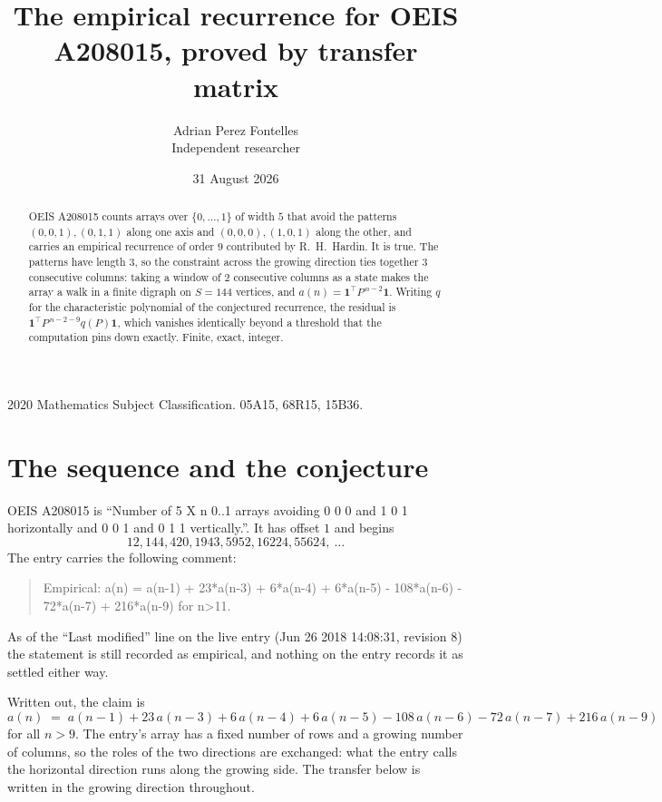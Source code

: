 \documentclass[11pt,a4paper]{article}
\title{The empirical recurrence for OEIS A208015, proved by transfer matrix}
\author{Adrian Perez Fontelles\\ \small Independent researcher}
\date{31 August 2026}
\theoremstyle{plain}
\theoremstyle{definition}
\begin{document}
\maketitle

\begin{abstract}
OEIS A208015 counts arrays over $\{0,\dots,1\}$ of width $5$ that avoid the patterns
$(0,0,1), (0,1,1)$ along one axis and $(0,0,0), (1,0,1)$ along the other, and carries an empirical recurrence of
order $9$ contributed by R.~H.~Hardin. It is true. The patterns have length $3$, so
the constraint across the growing direction ties together $3$ consecutive columns: taking a
window of $2$ consecutive columns as a state makes the array a walk in a finite digraph
on $S=144$ vertices, and $a(n)=\mathbf{1}^{\!\top}P^{\,n-2}\mathbf{1}$. Writing $q$
for the characteristic polynomial of the conjectured recurrence, the residual is
$\mathbf{1}^{\!\top}P^{\,n-2-9}q(P)\mathbf{1}$, which vanishes identically
beyond a threshold that the computation pins down exactly. Finite, exact, integer.
\end{abstract}

\noindent\small 2020 Mathematics Subject Classification. 05A15, 68R15, 15B36.\normalsize

\section{The sequence and the conjecture}

OEIS A208015 is ``Number of 5 X n 0..1 arrays avoiding 0 0 0 and 1 0 1 horizontally and 0 0 1 and 0 1 1 vertically.''. It has offset
$1$ and begins
\[
12, 144, 420, 1943, 5952, 16224, 55624,\ \dots
\]
The entry carries the following comment:
\begin{quote}\small
Empirical: a(n) = a(n-1) + 23*a(n-3) + 6*a(n-4) + 6*a(n-5) - 108*a(n-6) - 72*a(n-7) + 216*a(n-9) for n>11.
\end{quote}
As of the ``Last modified'' line on the live entry (Jun 26 2018 14:08:31, revision
8) the statement is still recorded as empirical, and nothing on the entry
records it as settled either way.

Written out, the claim is
\begin{equation}\label{eq:conj}
a(n)\;=\;a(n-1) + 23\,a(n-3) + 6\,a(n-4) + 6\,a(n-5) - 108\,a(n-6) - 72\,a(n-7) + 216\,a(n-9)
\end{equation}
for all $n>9$. The entry's array has a fixed number of rows and a growing number of
columns, so the roles of the two directions are exchanged: what the entry calls the
horizontal direction runs along the growing side. The transfer below is written in the
growing direction throughout.
\end{document}
